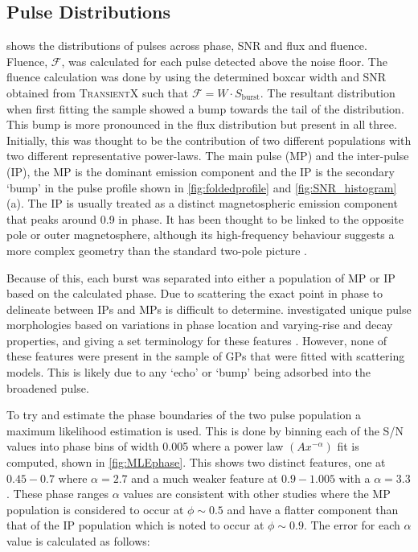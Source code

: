 


\subsection{Pulse Distributions}

 shows the distributions of pulses across phase, SNR and flux and fluence. Fluence, $\mathcal{F}$, was calculated for each pulse detected above the noise floor. The fluence calculation was done by using the determined boxcar width and SNR obtained from \textsc{TransientX} such that $\mathcal{F} = {W} \cdot S_{\text{burst}}$. The resultant distribution when first fitting the sample showed a bump towards the tail of the distribution. This bump is more pronounced in the flux distribution but present in all three. Initially, this was thought to be the contribution of two different populations with two different representative power-laws. The main pulse (MP) and the inter-pulse (IP), the MP is the dominant emission component and the IP is the secondary `bump' in the pulse profile shown in \cref{fig:foldedprofile} and \cref{fig:SNR_histogram} (a). The IP is usually treated as a distinct magnetospheric emission component that peaks around 0.9 in phase. It has been thought to be linked to the opposite pole or outer magnetosphere, although its high-frequency behaviour suggests a more complex geometry than the standard two-pole picture \citep{cordes_brightest_2004, petrova_physics_2008}. 

Because of this, each burst was separated into either a population of MP or IP based on the calculated phase. Due to scattering the exact point in phase to delineate between IPs and MPs is difficult to determine. \cite{driessen_scattering_2019} investigated unique pulse morphologies based on variations in phase location and varying-rise and decay properties, and giving a set terminology for these features \citep[e.g. fig 7;][]{driessen_scattering_2019}. However, none of these features were present in the sample of GPs that were fitted with scattering models. This is likely due to any `echo' or `bump' being adsorbed into the broadened pulse. 

To try and estimate the phase boundaries of the two pulse population a maximum likelihood estimation \citep[MLE;][]{clauset_power-law_2009} is used. This is done by binning each of the S/N values into phase bins of width 0.005 where a power law $(Ax^{-\alpha})$ fit is computed, shown in \cref{fig:MLEphase}. This shows two distinct features, one at $0.45-0.7$ where $\alpha=2.7$ and a much weaker feature at $0.9-1.005$ with a $\alpha=3.3$. These phase ranges $\alpha$ values are consistent with other studies \citep[i.e.][]{karuppusamy_crab_2012} where the MP population is considered to occur at $\phi \sim0.5$ and have a flatter component than that of the IP population which is noted to occur at $\phi \sim 0.9$. The error for each $\alpha$ value is calculated as follows: 

